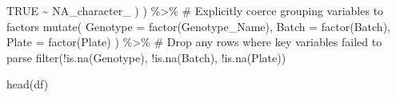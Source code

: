 \documentclass[
  letterpaper,
  DIV=11,
  numbers=noendperiod]{scrartcl}
\newenvironment{Shaded}{\begin{snugshade}}{\end{snugshade}}
\newcommand{\AttributeTok}[1]{\textcolor[rgb]{0.40,0.45,0.13}{#1}}
\newcommand{\CommentTok}[1]{\textcolor[rgb]{0.37,0.37,0.37}{#1}}
\newcommand{\ConstantTok}[1]{\textcolor[rgb]{0.56,0.35,0.01}{#1}}
\newcommand{\FunctionTok}[1]{\textcolor[rgb]{0.28,0.35,0.67}{#1}}
\newcommand{\NormalTok}[1]{\textcolor[rgb]{0.00,0.23,0.31}{#1}}
\newcommand{\SpecialCharTok}[1]{\textcolor[rgb]{0.37,0.37,0.37}{#1}}
\begin{document}
\begin{Shaded}
\begin{Highlighting}[]
      \ConstantTok{TRUE} \SpecialCharTok{\textasciitilde{}} \ConstantTok{NA\_character\_}
\NormalTok{    )}
\NormalTok{  ) }\SpecialCharTok{\%\textgreater{}\%}
   \CommentTok{\# Explicitly coerce grouping variables to factors}
  \FunctionTok{mutate}\NormalTok{(}
    \AttributeTok{Genotype =} \FunctionTok{factor}\NormalTok{(Genotype\_Name),}
    \AttributeTok{Batch    =} \FunctionTok{factor}\NormalTok{(Batch),}
    \AttributeTok{Plate    =} \FunctionTok{factor}\NormalTok{(Plate)}
\NormalTok{  ) }\SpecialCharTok{\%\textgreater{}\%}
  \CommentTok{\# Drop any rows where key variables failed to parse}
  \FunctionTok{filter}\NormalTok{(}\SpecialCharTok{!}\FunctionTok{is.na}\NormalTok{(Genotype), }\SpecialCharTok{!}\FunctionTok{is.na}\NormalTok{(Batch), }\SpecialCharTok{!}\FunctionTok{is.na}\NormalTok{(Plate))}


\FunctionTok{head}\NormalTok{(df)}
\end{Highlighting}
\end{Shaded}
\end{document}
